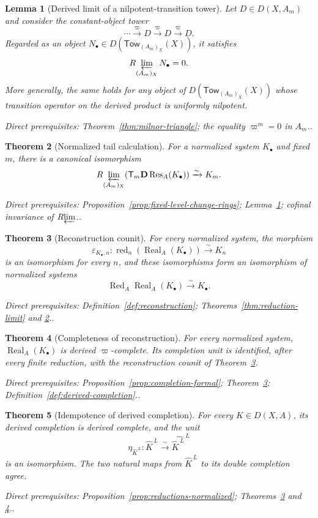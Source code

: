 \documentclass[10pt]{article}
\newtheorem{theorem}{Theorem}[section]
\newtheorem{lemma}[theorem]{Lemma}
\theoremstyle{definition}
\newcommand{\Rlim}{R\!\varprojlim}
\newcommand{\depends}[1]{\par\smallskip\noindent\textit{Direct prerequisites:} #1.}
\begin{document}
\begin{lemma}[Derived limit of a nilpotent-transition tower]
\label{lem:nilpotent-tower}
Let $D\in D(X,A_m)$ and consider the constant-object tower
\[
 \cdots\xrightarrow{\varpi}D\xrightarrow{\varpi}D
 \xrightarrow{\varpi}D.
\]
Regarded as an object $N_\bullet\in
D(\mathsf{Tow}_{(A_m)_X}(X))$, it satisfies
\[
 \Rlim_{(A_m)_X}N_\bullet=0.
\]
More generally, the same holds for any object of
$D(\mathsf{Tow}_{(A_m)_X}(X))$ whose transition operator on the derived
product is uniformly nilpotent.
\depends{Theorem~\ref{thm:milnor-triangle}; the equality
$\varpi^m=0$ in $A_m$.}
\end{lemma}

\begin{theorem}[Normalized tail calculation]\label{thm:normalized-tail}
For a normalized system $K_\bullet$ and fixed $m$, there is a canonical
isomorphism
\[
 \Rlim_{(A_m)_X}\!\left(
 \mathsf T_m\mathbf D\operatorname{Res}_A(K_\bullet)
 \right)\xrightarrow{\sim}K_m.
\]
\depends{Proposition~\ref{prop:fixed-level-change-rings};
Lemma~\ref{lem:nilpotent-tower}; cofinal invariance of $\Rlim$.}
\end{theorem}

\begin{theorem}[Reconstruction counit]\label{thm:reconstruction-counit}
For every normalized system, the morphism
\[
 \varepsilon_{K_\bullet,n}:
 \operatorname{red}_n(\operatorname{Real}_A(K_\bullet))
 \xrightarrow{\sim}K_n
\]
is an isomorphism for every $n$, and these isomorphisms form an isomorphism
of normalized systems
\[
 \operatorname{Red}_A\operatorname{Real}_A(K_\bullet)
       \xrightarrow{\sim}K_\bullet.
\]
\depends{Definition~\ref{def:reconstruction};
Theorems~\ref{thm:reduction-limit} and \ref{thm:normalized-tail}.}
\end{theorem}

\begin{theorem}[Completeness of reconstruction]\label{thm:real-complete}
For every normalized system,
$\operatorname{Real}_A(K_\bullet)$ is derived $\varpi$-complete.  Its
completion unit is identified, after every finite reduction, with the
reconstruction counit of Theorem~\ref{thm:reconstruction-counit}.
\depends{Proposition~\ref{prop:completion-formal};
Theorem~\ref{thm:reconstruction-counit}; Definition~\ref{def:derived-completion}.}
\end{theorem}

\begin{theorem}[Idempotence of derived completion]
\label{thm:completion-idempotent}
For every $K\in D(X,A)$, its derived completion is derived complete, and
the unit
\[
 \eta_{\widehat K^{\,L}}:\widehat K^{\,L}
 \xrightarrow{\sim}\widehat{\widehat K^{\,L}}^{\,L}
\]
is an isomorphism.  The two natural maps from
$\widehat K^{\,L}$ to its double completion agree.
\depends{Proposition~\ref{prop:reductions-normalized};
Theorems~\ref{thm:reconstruction-counit} and \ref{thm:real-complete}.}
\end{theorem}
\end{document}
